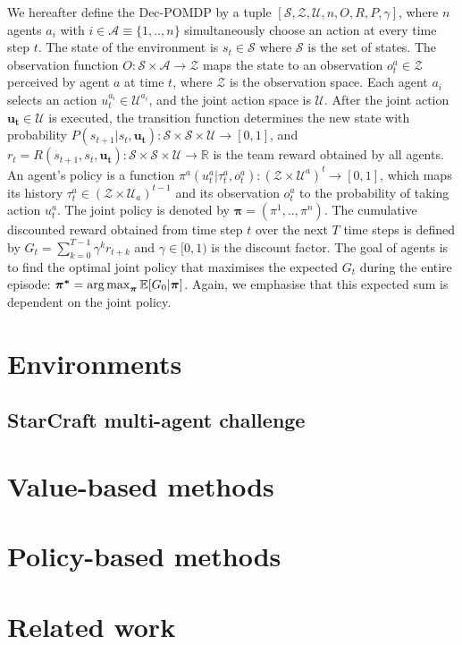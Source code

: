 We hereafter define the Dec-POMDP by a tuple $[\mathcal{S}, \mathcal{Z}, \mathcal{U}, n, O, R, P, \gamma]$, where $n$ agents $a_i$ with  $i\in \mathcal{A} \equiv \{1,..,n\}$ simultaneously choose an action at every time step $t$.
The state of the environment is $s_t \in \mathcal{S}$ where $\mathcal{S}$ is the set of states.
The observation function $O: \mathcal{S} \times \mathcal{A} \rightarrow \mathcal{Z}$ maps the state to an observation $o_t^{a} \in \mathcal{Z}$ perceived by agent $a$ at time $t$, where $\mathcal{Z}$ is the observation space.
Each agent $a_i$ selects an action $u_t^{a_i} \in \mathcal{U}^{a_i}$, and the joint action space is $\mathcal{U}$.
After the joint action $\boldsymbol{u_t} \in \mathcal{U}$ is executed, the transition function determines the new state with probability $P(s_{t+1}|s_t, \boldsymbol{u_t}): \mathcal{S} \times \mathcal{S} \times\mathcal{U} \rightarrow  [0,1] $, and $r_t=R(s_{t+1}, s_t, \boldsymbol {u_t}): \mathcal{S} \times \mathcal{S} \times \mathcal{U} \rightarrow \mathbb{R}$ is the team reward obtained by all agents.
An agent's policy is a function $\pi^{a}(u_t^{a}|\tau_t^{a},o_t^{a}): (\mathcal{Z} \times \mathcal{U}^a)^t \rightarrow [0,1]$, which maps its history $\tau_t^{a} \in (\mathcal{Z} \times \mathcal{U}_a)^{t-1}$ and its observation $o_t^{a}$ to the probability of taking action $u_t^{a}$. 
The joint policy is denoted by $\boldsymbol{\pi}=(\pi^1,..,\pi^n)$.
The cumulative discounted reward obtained from time step $t$ over the next $T$ time steps is defined by $G_{t} = \sum_{k=0}^{T-1} \gamma^k r_{t+k}$ and $\gamma \in [0, 1)$ is the discount factor.
The goal of agents is to find the optimal joint policy that maximises the expected $G_t$ during the entire episode: $\boldsymbol{\pi^{*}} =\operatorname*{arg\,max}_{\boldsymbol{\pi}} \mathbb{E}[G_0|\boldsymbol{\pi}]$.
Again, we emphasise that this expected sum is dependent on the joint policy.



\section{Environments}
\label{sec:ch3_env}

\subsection{StarCraft multi-agent challenge}

\section{Value-based methods}
\label{sec:ch3_value}

\section{Policy-based methods}
\label{sec:ch3_policy}

\section{Related work}
\label{sec:ch3_rel_work}

